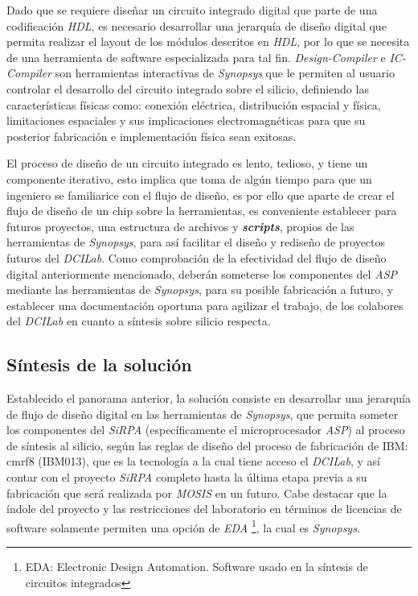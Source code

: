 Dado que se requiere diseñar un circuito integrado digital que parte de una codificación \textit{HDL}, es necesario desarrollar una jerarquía de diseño digital que permita realizar el layout de los módulos descritos en \textit{HDL}, por lo que se necesita de una herramienta de software especializada para tal fin. \textit{Design-Compiler} e \textit{IC-Compiler} son herramientas interactivas de \textit{Synopsys} que le permiten al usuario controlar el desarrollo del circuito integrado sobre el silicio, definiendo las características físicas como: conexión eléctrica, distribución espacial y física, limitaciones espaciales y sus implicaciones electromagnéticas para que su posterior fabricación e implementación física sean exitosas.

El proceso de diseño de un circuito integrado es lento, tedioso, y tiene un componente iterativo, esto implica que toma de algún tiempo para que un ingeniero se familiarice con el flujo de diseño, es por ello que aparte de crear el flujo de diseño de un chip sobre la herramientas, es conveniente establecer para futuros proyectos, una estructura de archivos y \textit{\textbf{scripts}}, propios de las herramientas de \textit{Synopsys}, para así facilitar el diseño y rediseño de proyectos futuros del \textit{DCILab}. Como comprobación de la efectividad del flujo de diseño digital anteriormente mencionado, deberán someterse los componentes del \textit{ASP} mediante las herramientas de  \textit{Synopsys}, para su posible fabricación a futuro, y establecer una documentación oportuna para agilizar el trabajo, de los colabores del \textit{DCILab} en cuanto a síntesis sobre silicio respecta.

\subsection{Síntesis de la solución}
Establecido el panorama anterior, la solución consiste en desarrollar una jerarquía de flujo de diseño digital en las herramientas de \textit{Synopsys}, que permita someter los componentes del \textit{SiRPA} (específicamente el microprocesador \textit{ASP}) al proceso de síntesis al silicio, según las reglas de diseño del proceso de fabricación de IBM: cmrf8 (IBM013), que es la tecnología a la cual
tiene acceso el \textit{DCILab}, y así contar con el proyecto \textit{SiRPA} completo hasta la última etapa previa a su fabricación que será realizada por \textit{MOSIS} en un futuro.
Cabe destacar que la índole del proyecto y las restricciones del laboratorio en términos de licencias de software solamente permiten una opción de \textit{EDA} \footnote{EDA: Electronic Design Automation. Software usado en la síntesis de circuitos integrados}, la cual es \textit{Synopsys}.

